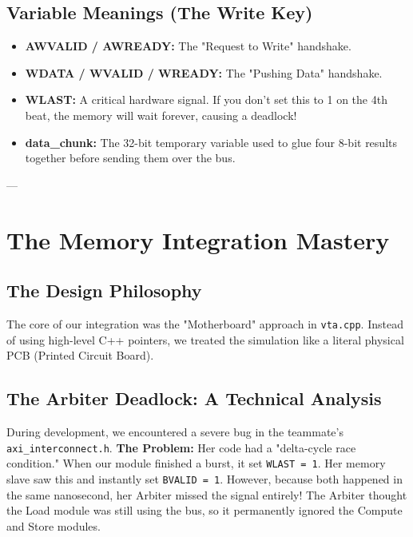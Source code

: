 \documentclass[11pt,a4paper]{report}
\begin{document}
\section{Variable Meanings (The Write Key)}
\begin{itemize}
    \item \textbf{AWVALID / AWREADY:} The "Request to Write" handshake.
    \item \textbf{WDATA / WVALID / WREADY:} The "Pushing Data" handshake.
    \item \textbf{WLAST:} A critical hardware signal. If you don't set this to 1 on the 4th beat, the memory will wait forever, causing a deadlock!
    \item \textbf{data\_chunk:} The 32-bit temporary variable used to glue four 8-bit results together before sending them over the bus.
\end{itemize}

---

\chapter{The Memory Integration Mastery}

\section{The Design Philosophy}
The core of our integration was the "Motherboard" approach in \texttt{vta.cpp}. Instead of using high-level C++ pointers, we treated the simulation like a literal physical PCB (Printed Circuit Board).

\section{The Arbiter Deadlock: A Technical Analysis}
During development, we encountered a severe bug in the teammate's \texttt{axi\_interconnect.h}. 
\textbf{The Problem:} Her code had a "delta-cycle race condition." When our module finished a burst, it set \texttt{WLAST = 1}. Her memory slave saw this and instantly set \texttt{BVALID = 1}. However, because both happened in the same nanosecond, her Arbiter missed the signal entirely! The Arbiter thought the Load module was still using the bus, so it permanently ignored the Compute and Store modules.
\end{document}
